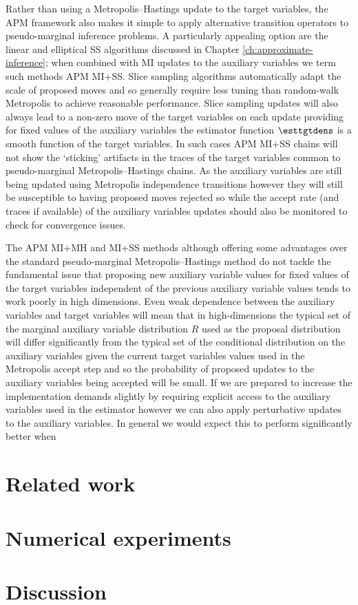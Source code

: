 Rather than using a Metropolis--Hastings update to the target variables, the \ac{APM} framework also makes it simple to apply alternative transition operators to pseudo-marginal inference problems. A particularly appealing option are the linear and elliptical \ac{SS} algorithms discussed in Chapter \ref{ch:approximate-inference}; when combined with MI updates to the auxiliary variables we term such methods \ac{APM} \ac{MI}+\ac{SS}. Slice sampling algorithms automatically adapt the scale of proposed moves and so generally require less tuning than random-walk Metropolis to achieve reasonable performance. Slice sampling updates will also always lead to a non-zero move of the target variables on each update providing for fixed values of the auxiliary variables the estimator function $\esttgtdens$ is a smooth function of the target variables. In such cases \ac{APM} \ac{MI}+\ac{SS} chains will not show the `sticking' artifacts in the traces of the target variables common to pseudo-marginal Metropolis--Hastings chains. As the auxiliary variables are still being updated using Metropolis independence transitions however they will still be susceptible to having proposed moves rejected so while the accept rate (and traces if available) of the auxiliary variables updates should also be monitored to check for convergence issues. %
	
The \ac{APM} \ac{MI}+\ac{MH} and \ac{MI}+\ac{SS} methods although offering some advantages over the standard pseudo-marginal Metropolis--Hastings method do not tackle the fundamental issue that proposing new auxiliary variable values for fixed values of the target variables independent of the previous auxiliary variable values tends to work poorly in high dimensions. Even weak dependence between the auxiliary variables and target variables will mean that in high-dimensions the typical set of the  marginal auxiliary variable distribution $R$ used as the proposal distribution will differ significantly from the typical set of the conditional distribution on the auxiliary variables given the current target variables values used in the Metropolis accept step and so the probability of proposed updates to the auxiliary variables being accepted will be small. If we are prepared to increase the implementation demands slightly by requiring explicit access to the auxiliary variables used in the estimator however we can also apply perturbative updates to the auxiliary variables. In general we would expect this to perform significantly better when


\section{Related work}


\section{Numerical experiments}

\section{Discussion}